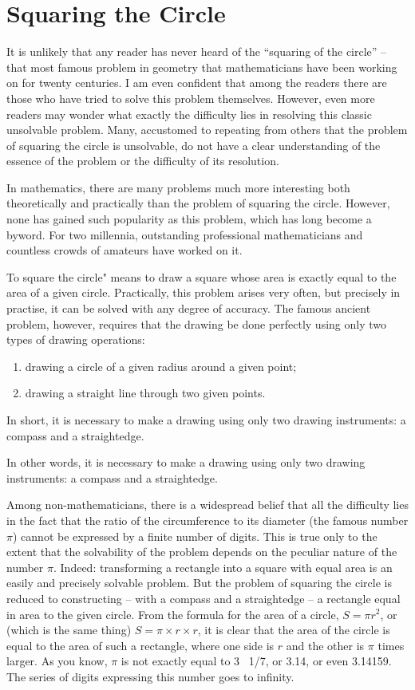 \section{Squaring the Circle}
\label{sec-9.6}

It is unlikely that any reader has never heard of the ``squaring of the circle'' -- that most famous problem in geometry that mathematicians have been working on for twenty centuries. I am even confident that among the readers there are those who have tried to solve this problem themselves. However, even more readers may wonder what exactly the difficulty lies in resolving this classic unsolvable problem. Many, accustomed to repeating from others that the problem of squaring the circle is unsolvable, do not have a clear understanding of the essence of the problem or the difficulty of its resolution.

In mathematics, there are many problems much more interesting both theoretically and practically than the problem of squaring the circle. However, none has gained such popularity as this problem, which has long become a byword. For two millennia, outstanding professional mathematicians and countless crowds of amateurs have worked on it.

To square the circle" means to draw a square whose area is exactly equal to the area of a given circle. Practically, this problem arises very often, but precisely in practise, it can be solved with any degree of accuracy. The famous ancient problem, however, requires that the drawing be done perfectly using only two types of drawing operations: 
\begin{enumerate}
\item drawing a circle of a given radius around a given point; 
\item drawing a straight line through two given points.
\end{enumerate}
In short, it is necessary to make a drawing using only two drawing instruments: a compass and a straightedge.


In other words, it is necessary to make a drawing using only two drawing instruments: a compass and a straightedge.

Among non-mathematicians, there is a widespread belief that all the difficulty lies in the fact that the ratio of the circumference to its diameter (the famous number $\pi$) cannot be expressed by a finite number of digits. This is true only to the extent that the solvability of the problem depends on the peculiar nature of the number $\pi$. Indeed: transforming a rectangle into a square with equal area is an easily and precisely solvable problem. But the problem of squaring the circle is reduced to constructing -- with a compass and a straightedge -- a rectangle equal in area to the given circle. From the formula for the area of a circle, $S = \pi r^2$, or (which is the same thing) $S = \pi \times r \times r$, it is clear that the area of the circle is equal to the area of such a rectangle, where one side is $r$ and the other is $\pi$ times larger. As you know, $\pi$ is not exactly equal to 3 \, 1/7, or 3.14, or even 3.14159. The series of digits expressing this number goes to infinity.

